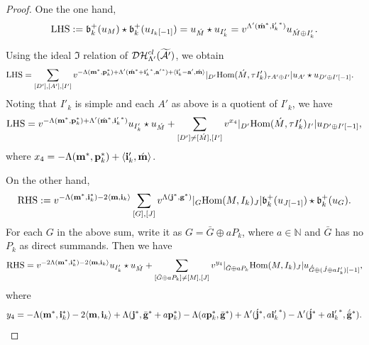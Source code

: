 \documentclass[reqno,12pt]{amsart}
\numberwithin{equation}{section}
\def\lr#1{\langle #1\rangle} \def\fin{\hfill$\square$}  \def\lra{\longrightarrow} \def\mod{\mbox{\rm \textbf{mod}}\,}\def\Mod{\mbox{\rm mod}\,}\def\top{\mbox{\rm top}\,}\def\soc{\mbox{\rm soc}\,}
\theoremstyle{plain} %
\theoremstyle{definition} %
\begin{document}
\begin{proof}
	
  One the one hand,
\begin{align*}
{\rm LHS}:=\mathfrak{b}_k^+(u_M)\star\mathfrak{b}_k^+(u_{I_k[-1]})=u_{\acute{M}}\star u_{I_k'}
=v^{\Lambda'(\acute{{\bf m}}^\ast,{{\bf i}_k'}^\ast)}u_{\acute{M}\oplus I_k'}.\end{align*}

Using the ideal $\mathfrak{I}$ relation of $\mathcal{DH}_{\Lambda'}^{cl}(\widetilde{\mathcal{A}'})$, we obtain
\begin{align*}
&{\rm LHS}=\sum_{[D'], [A'],[I']}v^{-\Lambda({\bf m}^\ast,{\bf p}_k^\ast)+\Lambda'(\acute{{\bf m}}^\ast+{{\bf i}_k'}^\ast, {\bf a'}^\ast)+\lr{{\bf i}_k'-{\bf a'},\acute{{\bf m}}}}|_{D'}\Hom(\acute{M},\tau I_k')_{\tau A'\oplus I'}|u_{A'}\star u_{D'\oplus I'[-1]}.\end{align*}
Noting that $I'_k$ is simple and each $A'$ as above is a quotient of $I'_k$, we have
\begin{align*}{\rm LHS}=v^{-\Lambda({\bf m}^\ast,{\bf p}_k^\ast)+\Lambda'(\acute{{\bf m}}^\ast, {{\bf i}_k'}^\ast)}u_{I_k'}\star u_{\acute{M}}
+\sum_{[D']\neq [\acute{M}],[I']}v^{x_4}|_{D'}\mbox{\rm Hom}(\acute{M},\tau I_k')_{ I'}|u_{D'\oplus I'[-1]},
\end{align*}
where $x_4=-\Lambda({\bf m}^\ast,{\bf p}_k^\ast)+\lr{{\bf i}_k',\acute{{\bf m}}}$.

On the other hand,	
\begin{align*}
{\rm RHS}:=v^{-\Lambda({\bf m}^\ast,{\bf i}_k^\ast)-2\lr{{\bf m},{{\bf i}_k}}}\sum_{[G],[J]}v^{\Lambda({\bf j}^\ast,{\bf g}^\ast)}|_G\Hom(M,I_k)_J|\mathfrak{b}_k^+(u_{J[-1]})\star \mathfrak{b}_k^+(u_G).\end{align*}
For each $G$ in the above sum, write it as $G=\bar{G}\oplus aP_k$, where $a\in\mathbb{N}$ and $\bar{G}$ has no $P_k$ as direct summands. Then we have
\begin{align*}
{\rm RHS}=v^{-2\Lambda({\bf m}^\ast,{\bf i}_k^\ast)-2\lr{{\bf m},{{\bf i}_k}}}u_{I_k'}\star u_{\acute{M}}
+\sum_{[\bar{G}\oplus aP_k]\neq [M],[J]}v^{y_4}|_{\bar{G}\oplus aP_k}\Hom(M,I_k)_J|u_{{\acute{\bar{G}}}\oplus (\acute{J}\oplus aI_k')[-1]},
\end{align*}
where \begin{align*}y_4=-\Lambda({\bf m}^\ast,{\bf i}_k^\ast)-2\lr{{\bf m},{{\bf i}_k}}+\Lambda({\bf j}^\ast, \bar{\bf g}^\ast+a{\bf p}_k^\ast)-\Lambda(a{\bf p}_k^\ast,\bar{\bf g}^\ast)+\Lambda'(\acute{{\bf j}}^\ast,a{{\bf i}_k'}^\ast)-\Lambda'(\acute{{\bf j}}^\ast+a{{\bf i}_k'}^\ast,\acute{\bar{\bf g}}^\ast).\end{align*}


\end{proof}
\end{document}

